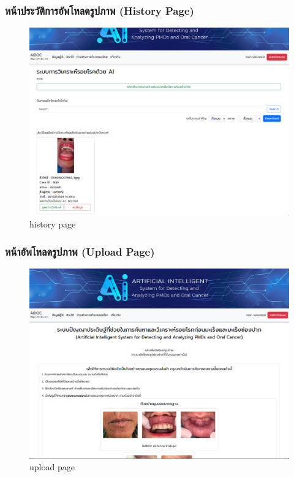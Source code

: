 \subsubsection{หน้าประวัติการอัพโหลดรูปภาพ (History Page)}

\begin{figure}[H]
  \centering
  \graphicspath{{./images/}}
  \includegraphics[scale=0.3]{history_volunteer.png}
  \caption{history page}
  \label{fig:history_volunteer}
\end{figure}

\subsubsection{หน้าอัพโหลดรูปภาพ (Upload Page)}
\begin{figure}[H]
  \centering
  \graphicspath{{./images/}}
  \includegraphics[scale=0.3]{upload_volunteer.png}
  \caption{upload page}
  \label{fig:upload_volunteer}
\end{figure}


